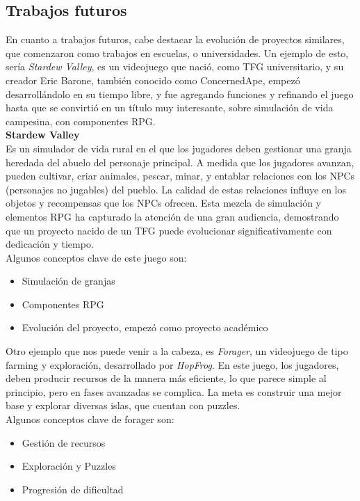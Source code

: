 \documentclass[a4paper]{article}
\begin{document}
\subsection{Trabajos futuros}
En cuanto a trabajos futuros, cabe destacar la evolución de proyectos similares, que comenzaron como trabajos en escuelas, o universidades. Un ejemplo de esto, sería \textit{Stardew Valley}, es un videojuego que nació,
como TFG universitario, y su creador Eric Barone, también conocido como ConcernedApe, empezó desarrollándolo en su tiempo libre, y fue agregando funciones y refinando el juego hasta que se convirtió en un título muy interesante, sobre simulación de vida campesina,
con componentes RPG. \\
\textbf{Stardew Valley}\\
Es un simulador de vida rural en el que los jugadores deben gestionar una granja heredada del abuelo del personaje principal. A medida que los jugadores avanzan, pueden cultivar, criar animales, pescar, minar, y entablar relaciones con los NPCs (personajes no jugables) del pueblo. La calidad de estas relaciones influye en los objetos y recompensas que los NPCs ofrecen. Esta mezcla de simulación y elementos RPG ha capturado la atención de una gran audiencia, demostrando que un proyecto nacido de un TFG puede evolucionar significativamente con dedicación y tiempo.\\
Algunos conceptos clave de este juego son:
\begin{itemize}
    \item Simulación de granjas
    \item Componentes RPG
    \item Evolución del proyecto, empezó como proyecto académico
\end{itemize}
Otro ejemplo que nos puede venir a la cabeza, es \textit{Forager}, un videojuego de tipo farming y exploración, desarrollado por \textit{HopFrog}. En este juego, los jugadores,
deben producir recursos de la manera más eficiente, lo que parece simple al principio, pero en fases avanzadas se complica. La meta es construir una mejor base y explorar diversas islas, que cuentan con puzzles.\\
Algunos conceptos clave de forager son:
\begin{itemize}
    \item Gestión de recursos
    \item Exploración y Puzzles
    \item Progresión de dificultad
\end{itemize}
\end{document}

